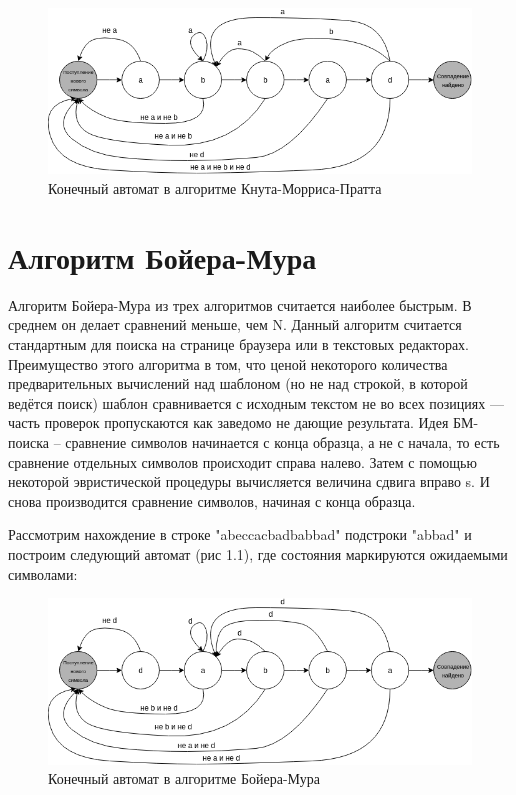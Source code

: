 \documentclass[12pt]{report}
\begin{document}
\begin{figure}[h!]
        	\begin{center}
        		\includegraphics[scale=0.5]{avt_1}
        		\caption{ Конечный автомат в алгоритме Кнута-Морриса-Пратта}
        		\label{fig:def}
        	\end{center}
        \end{figure}


\section{Алгоритм Бойера-Мура}

Алгоритм Бойера-Мура из трех алгоритмов считается наиболее быстрым. В среднем он делает сравнений меньше, чем N. Данный алгоритм считается стандартным для поиска на странице браузера или в текстовых редакторах. \\
Преимущество этого алгоритма в том, что ценой некоторого количества предварительных вычислений над шаблоном (но не над строкой, в которой ведётся поиск) шаблон сравнивается с исходным текстом не во всех позициях — часть проверок пропускаются как заведомо не дающие результата. Идея БМ-поиска – сравнение символов начинается с конца образца, а не с начала, то есть сравнение отдельных символов происходит справа налево. Затем с помощью некоторой эвристической процедуры вычисляется величина сдвига вправо s. И снова производится сравнение символов, начиная с конца образца. 

Рассмотрим нахождение в строке "abeccacbadbabbad" подстроки "abbad" и построим следующий автомат (рис 1.1), где состояния маркируются ожидаемыми символами:\\

\begin{figure}[!h]
        	\begin{center}
        		\includegraphics[scale=0.5]{avt_2}
        		\caption{ Конечный автомат в алгоритме Бойера-Мура}
        		\label{fig:def}
        	\end{center}
        \end{figure}
\end{document}
